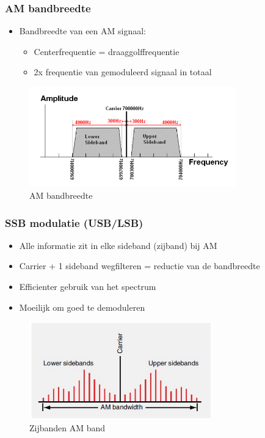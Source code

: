 \documentclass{article}
\begin{document}
\subsubsection{AM bandbreedte}
\begin{itemize}
    \item Bandbreedte van een AM signaal:
    \begin{itemize}
        \item Centerfrequentie = draaggolffrequentie
        \item 2x frequentie van gemoduleerd signaal in totaal
    \end{itemize}
\end{itemize}

\begin{figure}[H]
    \centering
    \includegraphics[width=0.8\textwidth]{Screenshot_20200302_120508.png}
    \caption{AM bandbreedte}
\end{figure}

\subsubsection{SSB modulatie (USB/LSB)}
\begin{itemize}
    \item Alle informatie zit in elke sideband (zijband) bij AM
    \item Carrier + 1 sideband wegfilteren = reductie van de bandbreedte
    \item Efficienter gebruik van het spectrum
    \item Moeilijk om goed te demoduleren
\end{itemize}
\begin{figure}[H]
    \centering
    \includegraphics[width=0.7\textwidth]{Screenshot_20200315_153734.png}
    \caption{Zijbanden AM band}
\end{figure}
\end{document}
